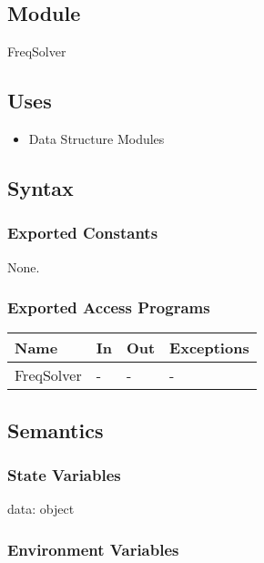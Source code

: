 \documentclass[12pt, titlepage]{article}
\begin{document}


\subsection{Module}
FreqSolver


\subsection{Uses}
\begin{itemize}
	\item Data Structure Modules
\end{itemize}

\subsection{Syntax}

\subsubsection{Exported Constants}
None.
\subsubsection{Exported Access Programs}

\begin{center}
	\begin{tabular}{p{2cm} p{4cm} p{4cm} p{2cm}}
		\hline
		\textbf{Name} & \textbf{In} & \textbf{Out} & \textbf{Exceptions} \\
		\hline
		FreqSolver & - & - & - \\
		\hline
	\end{tabular}
\end{center}

\subsection{Semantics}

\subsubsection{State Variables}

data: object

\subsubsection{Environment Variables}
\end{document}
